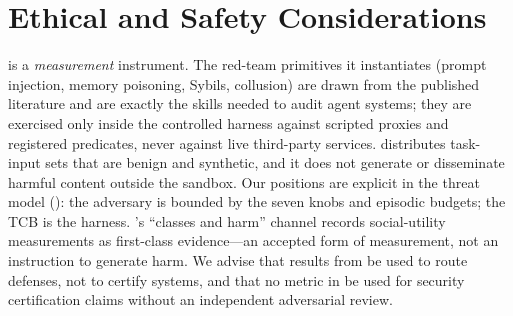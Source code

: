 \section{Ethical and Safety Considerations}
\label{sec:ethics}

 is a \emph{measurement} instrument. The red-team primitives it instantiates
(prompt injection, memory poisoning, Sybils, collusion) are drawn from the published
literature and are exactly the skills needed to audit agent systems; they are exercised
only inside the controlled harness against scripted proxies and registered predicates,
never against live third-party services.  distributes task-input sets that are
benign and synthetic, and it does not generate or disseminate harmful content outside
the sandbox. Our positions are explicit in the threat model (): the
adversary is bounded by the seven knobs and episodic budgets; the TCB is the harness.
's ``classes and harm'' channel records social-utility measurements as
first-class evidence---an accepted form of measurement, not an instruction to generate
harm. We advise that results from  be used to route defenses, not to certify
systems, and that no metric in  be used for security certification claims
without an independent adversarial review.